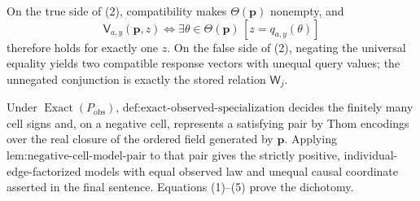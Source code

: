 On the true side of (2), compatibility makes \(\Theta(\mathbf p)\) nonempty, and
\[
\mathsf V_{a,y}(\mathbf p,z)
\Longleftrightarrow
\exists\theta\in\Theta(\mathbf p)\,[z=q_{a,y}(\theta)]
\tag{5}
\]
therefore holds for exactly one \(z\). On the false side of (2), negating the universal equality yields two compatible response vectors with unequal query values; the unnegated conjunction is exactly the stored relation \(\mathsf W_j\).

Under \(\operatorname{Exact}(P_{\mathrm{obs}})\), \(\text{def:exact-observed-specialization}\) decides the finitely many cell signs and, on a negative cell, represents a satisfying pair by Thom encodings over the real closure of the ordered field generated by \(\mathbf p\). Applying \(\text{lem:negative-cell-model-pair}\) to that pair gives the strictly positive, individual-edge-factorized models with equal observed law and unequal causal coordinate asserted in the final sentence. Equations (1)--(5) prove the dichotomy.